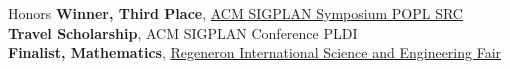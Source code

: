 
\begin{rSection}{Honors}
	\textbf{Winner, Third Place}, \href{https://popl23.sigplan.org/track/POPL-2023-student-research-competition}{ACM SIGPLAN Symposium POPL SRC \ExternalLink} \hfill \color{darkgray}{2023}
	\color{black}
	\\
	\textbf{Travel Scholarship}, ACM SIGPLAN Conference PLDI \hfill \color{darkgray}{2022}
	\color{black}
	\\
	\textbf{Finalist, Mathematics}, \href{https://projectboard.world/isef/project/math029t---dsl-for-des-with-denotational-semantics}{Regeneron International Science and Engineering Fair \ExternalLink}\href{https://abstracts.societyforscience.org/Home/FullAbstract?ISEFYears=2020%2C&Category=Any%20Category&Finalist=Ramos&AllAbstracts=True&FairCountry=Puerto%20Rico&FairState=Any%20State&ProjectId=19617}{\ExternalLink} \hfill \color{darkgray}{2020 \& 2021}
	\color{black} 

\end{rSection} 
